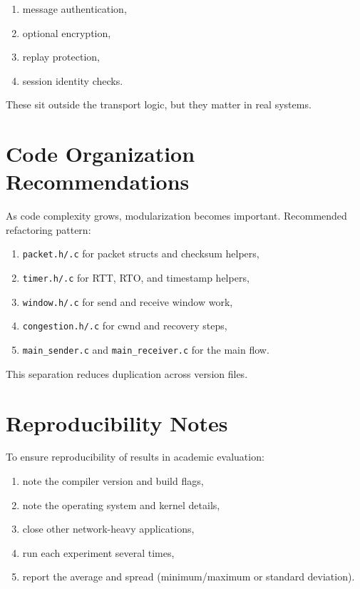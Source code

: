 \begin{enumerate}
    \item message authentication,
    \item optional encryption,
    \item replay protection,
    \item session identity checks.
\end{enumerate}

These sit outside the transport logic, but they matter in real systems.

\clearpage
\section{Code Organization Recommendations}
As code complexity grows, modularization becomes important. Recommended
refactoring pattern:

\begin{enumerate}
    \item \texttt{packet.h/.c} for packet structs and checksum helpers,
    \item \texttt{timer.h/.c} for RTT, RTO, and timestamp helpers,
    \item \texttt{window.h/.c} for send and receive window work,
    \item \texttt{congestion.h/.c} for cwnd and recovery steps,
    \item \texttt{main\_sender.c} and \texttt{main\_receiver.c} for the main flow.
\end{enumerate}

This separation reduces duplication across version files.

\section{Reproducibility Notes}
To ensure reproducibility of results in academic evaluation:

\begin{enumerate}
    \item note the compiler version and build flags,
    \item note the operating system and kernel details,
    \item close other network-heavy applications,
    \item run each experiment several times,
    \item report the average and spread (minimum/maximum or standard deviation).
\end{enumerate}

